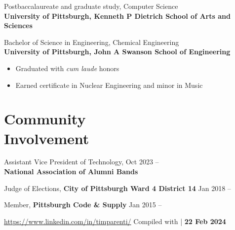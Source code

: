 \documentclass[11pt]{article}
\newcommand{\lmr}{\fontfamily{lmr}\selectfont} %
\newcommand{\textdb}[1]{\fontseries{db}\selectfont#1\normalfont}
\newcommand{\present}{\phantom{Xxx 20XX}}
\begin{document}
\textdb{
Postbaccalaureate and graduate study, Computer Science
	\\
}
\textbf{University of Pittsburgh, Kenneth P Dietrich School of Arts and Sciences}

\textdb{
Bachelor of Science in Engineering, Chemical Engineering
	\\
}
\textbf{University of Pittsburgh, John A Swanson School of Engineering}
\begin{itemize}
	\item Graduated with \emph{cum laude} honors
	\item Earned certificate in Nuclear Engineering and minor in Music
\end{itemize}



\section{Community\\ Involvement}

\textdb{
Assistant Vice President of Technology,
	\hfill Oct 2023 -- \present \\
}
\textbf{National Association of Alumni Bands}

\textdb{
Judge of Elections,
\textbf{City of Pittsburgh Ward 4 District 14}
	\hfill Jan 2018 -- \present
}

\textdb{
Member,
\textbf{Pittsburgh Code \& Supply}
	\hfill Jan 2015 -- \present
}



\begin{adjustwidth}{-1in}{0pt}
	\hrulefill \par
	\hypersetup{linkcolor=gray}
	\small
	\url{https://www.linkedin.com/in/timparenti/} \hfill {\lmr Compiled with \XeLaTeX} | \textbf{22 Feb 2024}
\end{adjustwidth}
\end{document}
